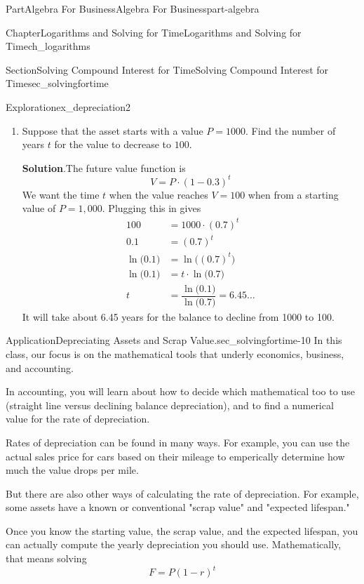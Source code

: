 \documentclass[oneside,10pt,]{tufte-book}
\newcommand{\blocktitlefont}{\relax}
\numberwithin{equation}{chapter}
\newcommand{\amp}{&}
\begin{document}
\begin{partptx}{Part}{Algebra For Business}{}{Algebra For Business}{}{}{part-algebra}
\begin{chapterptx}{Chapter}{Logarithms and Solving for Time}{}{Logarithms and Solving for Time}{}{}{ch_logarithms}
\begin{sectionptx}{Section}{Solving Compound Interest for Time}{}{Solving Compound Interest for Time}{}{}{sec_solvingfortime}
\begin{exploration}{Exploration}{}{ex_depreciation2}
\begin{enumerate}[font=\bfseries,label=(\alph*),ref=\alph*]
The starting value must have been about \textdollar{}3,612.38%
\item{}Suppose that the asset starts with a value \(P=1000\). Find the number of years \(t\) for the value to decrease to \(100\).%
\par\smallskip%
\noindent\textbf{\blocktitlefont Solution}.\hypertarget{ex_depreciation2-4-2}{}\quad{}The future value function is%
\begin{equation*}
V = P \cdot (1-0.3)^t 
\end{equation*}
We want the time \(t\) when the value reaches \(V=100\) when from a starting value of \(P=1,000\).  Plugging this in gives%
\begin{align*}
100 \amp = 1000 \cdot (0.7)^t\\
0.1 \amp =  (0.7)^t\\
\ln\Big(0.1\Big) \amp =  \ln\Big((0.7)^t\Big)\\
\ln\Big(0.1\Big) \amp =  t\cdot \ln\Big(0.7\Big)\\
t \amp = \dfrac{ \ln\Big(0.1\Big)}{\ln\Big(0.7\Big)} = 6.45\dots
\end{align*}
It will take about 6.45 years for the balance to decline from 1000 to 100.%
\end{enumerate}%
\end{exploration}%
\begin{insight}{Application}{Depreciating Assets and Scrap Value.}{sec_solvingfortime-10}%
In this class, our focus is on the mathematical tools that underly economics, business, and accounting.%
\par
In accounting, you will learn about how to decide which mathematical too to use (straight line versus declining balance depreciation), and to find a numerical value for the rate of depreciation.%
\par
Rates of depreciation can be found in many ways. For example, you can use the actual sales price for cars based on their mileage to emperically determine how much the value drops per mile.%
\par
But there are also other ways of calculating the rate of depreciation. For example, some assets have a known or conventional "scrap value" and "expected lifespan."%
\par
Once you know the starting value, the scrap value, and the expected lifespan, you can actually compute the yearly depreciation you should use. Mathematically, that means solving%
\begin{equation*}
F = P ( 1- r)^t
\end{equation*}

\end{insight}
\end{sectionptx}
\end{chapterptx}
\end{partptx}
\end{document}

